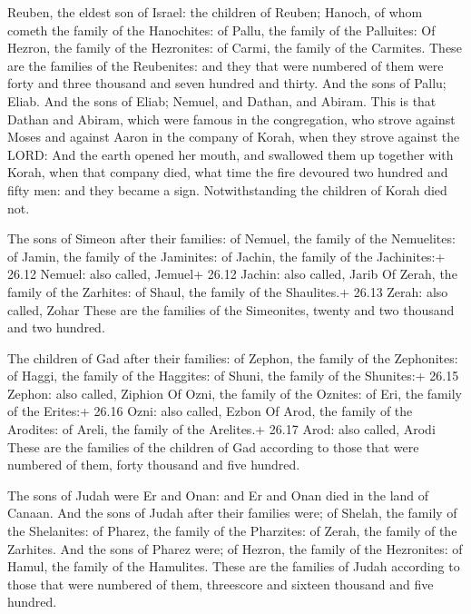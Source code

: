  Reuben, the eldest son of Israel: the children of Reuben;
Hanoch, of whom cometh the family of the Hanochites: of Pallu, the
family of the Palluites:  Of Hezron, the family of the
Hezronites: of Carmi, the family of the Carmites.  These are
the families of the Reubenites: and they that were numbered of them were
forty and three thousand and seven hundred and thirty.  And
the sons of Pallu; Eliab.  And the sons of Eliab; Nemuel,
and Dathan, and Abiram. This is that Dathan and Abiram, which were
famous in the congregation, who strove against Moses and against Aaron
in the company of Korah, when they strove against the LORD:
 And the earth opened her mouth, and swallowed them up
together with Korah, when that company died, what time the fire devoured
two hundred and fifty men: and they became a sign. 
Notwithstanding the children of Korah died not.

 The sons of Simeon after their families: of Nemuel, the
family of the Nemuelites: of Jamin, the family of the Jaminites: of
Jachin, the family of the Jachinites:+ 26.12 Nemuel: also called,
Jemuel+ 26.12 Jachin: also called, Jarib  Of Zerah, the
family of the Zarhites: of Shaul, the family of the Shaulites.+ 26.13
Zerah: also called, Zohar  These are the families of the
Simeonites, twenty and two thousand and two hundred.

 The children of Gad after their families: of Zephon, the
family of the Zephonites: of Haggi, the family of the Haggites: of
Shuni, the family of the Shunites:+ 26.15 Zephon: also called, Ziphion
 Of Ozni, the family of the Oznites: of Eri, the family of
the Erites:+ 26.16 Ozni: also called, Ezbon  Of Arod, the
family of the Arodites: of Areli, the family of the Arelites.+ 26.17
Arod: also called, Arodi  These are the families of the
children of Gad according to those that were numbered of them, forty
thousand and five hundred.

 The sons of Judah were Er and Onan: and Er and Onan died
in the land of Canaan.  And the sons of Judah after their
families were; of Shelah, the family of the Shelanites: of Pharez, the
family of the Pharzites: of Zerah, the family of the Zarhites.
 And the sons of Pharez were; of Hezron, the family of the
Hezronites: of Hamul, the family of the Hamulites.  These
are the families of Judah according to those that were numbered of them,
threescore and sixteen thousand and five hundred.

